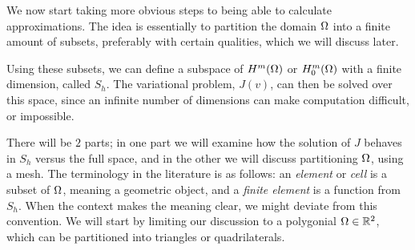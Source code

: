 We now start taking more obvious steps to being able to calculate approximations. 
The idea is essentially to partition the domain $\Omega$ into a finite amount 
of subsets, preferably with certain qualities, which we will discuss later. 

Using these subsets, we can define a subspace of $H^m(\Omega)$ or $H^m_0(\Omega)$ 
with a finite dimension, called $S_h$. The variational problem, $J(v)$, can then be 
solved over this space, since an infinite number of dimensions can make 
computation difficult, or impossible.

There will be $2$ parts; in one part we 
will examine how the solution of $J$ behaves in $S_h$ versus the full space, 
and in the other we will discuss partitioning $\Omega$, using a mesh.
The terminology in the literature is as follows: an \emph{element} or \emph{cell} is a 
subset of $\Omega$, meaning a geometric object, and a \emph{finite element} is a 
function from $S_h$. When the context makes the meaning clear, we might deviate from 
this convention.
We will start by limiting our discussion to a polygonial $\Omega \in \mathbb{R}^2$, which 
can be partitioned into triangles or quadrilaterals.